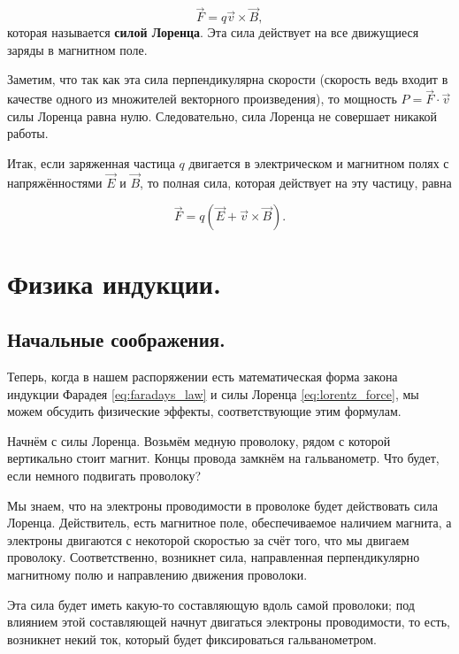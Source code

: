 \documentclass[a4paper,12pt]{article}
\begin{document}
\begin{equation}
  \label{eq:lorentz_force}
  \vec{F} = q \vec{v} \times \vec{B},
\end{equation}
которая называется \textbf{силой Лоренца}. Эта сила действует на все
движущиеся заряды в магнитном поле. 

Заметим, что так как эта сила перпендикулярна скорости (скорость ведь
входит в качестве одного из множителей векторного произведения), то
мощность $P = \vec{F} \cdot \vec{v} $ силы Лоренца равна
нулю. Следовательно, сила Лоренца не совершает никакой работы. 

Итак, если заряженная частица $q$ двигается в электрическом и
магнитном полях с напряжённостями $\vec{E}$ и $\vec{B}$, то полная
сила, которая действует на эту частицу, равна

\begin{equation}
  \label{eq:lorentz_force_full}
  \vec{F} = q \left( \vec{E} + \vec{v} \times \vec{B} \right). 
\end{equation}

\section{Физика индукции.}
\label{sec:induction}

\subsection{Начальные соображения.}
\label{sec:induction_start}



Теперь, когда в нашем распоряжении есть математическая форма закона
индукции Фарадея \eqref{eq:faradays_law} и силы Лоренца
\eqref{eq:lorentz_force}, мы можем обсудить физические эффекты,
соответствующие этим формулам. 

Начнём с силы Лоренца. Возьмём медную проволоку, рядом с которой
вертикально стоит магнит. Концы провода замкнём на гальванометр. Что
будет, если немного подвигать проволоку? 

Мы знаем, что на электроны проводимости в проволоке будет действовать
сила Лоренца. Действитель, есть магнитное поле, обеспечиваемое
наличием магнита, а электроны двигаются с некоторой скоростью за счёт
того, что мы двигаем проволоку. Соответственно, возникнет сила,
направленная перпендикулярно магнитному полю и направлению движения
проволоки. 

Эта сила будет иметь какую-то составляющую вдоль самой проволоки; под
влиянием этой составляющей начнут двигаться электроны проводимости, то
есть, возникнет некий ток, который будет фиксироваться
гальванометром. 
\end{document}
